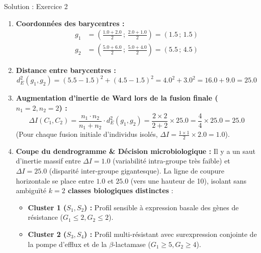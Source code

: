 \documentclass[11pt,a4paper]{article}
\begin{document}
\begin{solutionbox}{Solution : Exercice 2}
\begin{enumerate}[label=\textbf{\alph*.}]
  \item \textbf{Coordonnées des barycentres :}
  \begin{align*}
    g_1 &= \left( \frac{1.0 + 2.0}{2} \,;\, \frac{2.0 + 1.0}{2} \right) = \mathbf{(1.5 \,;\, 1.5)} \\
    g_2 &= \left( \frac{5.0 + 6.0}{2} \,;\, \frac{5.0 + 4.0}{2} \right) = \mathbf{(5.5 \,;\, 4.5)}
  \end{align*}
  \item \textbf{Distance entre barycentres :}
  \begin{equation*}
    d_E^2(g_1, g_2) = (5.5 - 1.5)^2 + (4.5 - 1.5)^2 = 4.0^2 + 3.0^2 = 16.0 + 9.0 = \mathbf{25.0}
  \end{equation*}
  \item \textbf{Augmentation d'inertie de Ward lors de la fusion finale ($n_1 = 2, n_2 = 2$) :}
  \begin{equation*}
    \Delta I(C_1, C_2) = \frac{n_1 \cdot n_2}{n_1 + n_2} \cdot d_E^2(g_1, g_2) = \frac{2 \times 2}{2 + 2} \times 25.0 = \frac{4}{4} \times 25.0 = \mathbf{25.0}
  \end{equation*}
  (Pour chaque fusion initiale d'individus isolés, $\Delta I = \frac{1 \times 1}{2} \times 2.0 = \mathbf{1.0}$).
  \item \textbf{Coupe du dendrogramme \& Décision microbiologique :}
  Il y a un saut d'inertie massif entre $\Delta I = 1.0$ (variabilité intra-groupe très faible) et $\Delta I = 25.0$ (disparité inter-groupe gigantesque).
  La ligne de coupure horizontale se place entre $1.0$ et $25.0$ (vers une hauteur de 10), isolant sans ambiguïté \textbf{$k = 2$ classes biologiques distinctes} :
  \begin{itemize}
    \item \textbf{Cluster 1 ($S_1, S_2$) :} Profil sensible à expression basale des gènes de résistance ($G_1 \le 2, G_2 \le 2$).
    \item \textbf{Cluster 2 ($S_3, S_4$) :} Profil multi-résistant avec surexpression conjointe de la pompe d'efflux et de la $\beta$-lactamase ($G_1 \ge 5, G_2 \ge 4$).
  \end{itemize}
\end{enumerate}
\end{solutionbox}
\end{document}
